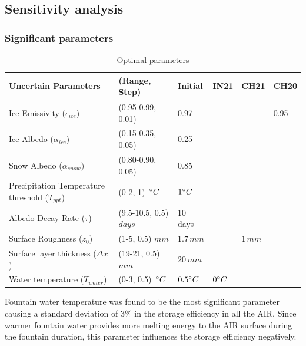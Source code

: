 \documentclass[utf8]{frontiersSCNS} %
\begin{document}
\subsection{Sensitivity analysis}
\subsubsection{Significant parameters}

\begin{table}
	\centering
	\caption{Optimal parameters}
	\label{tab:parameters}
	\begin{tabular}{@{}llllll@{}}
		\toprule
		\textbf{Uncertain Parameters}                             & \textbf{(Range, Step)}   & \textbf{Initial} & \textbf{IN21} & \textbf{CH21} & \textbf{CH20} \\\midrule
		Ice Emissivity ($\epsilon_{ice}$)               & (0.95-0.99, 0.01)        & 0.97             &           & & 0.95               \\
		Ice Albedo ($\alpha_{ice}$)                     & (0.15-0.35, 0.05)        & 0.25             &           & &               \\
		Snow Albedo ($\alpha_{snow})$                   & (0.80-0.90, 0.05)        & 0.85             &           & &               \\
		Precipitation Temperature threshold ($T_{ppt}$) & (0-2, 1) $\,\degree C$   & $1\degree C$     &           & &               \\
		Albedo Decay Rate ($\tau$)                      & (9.5-10.5, 0.5) $days$   & 10 days          &           & &              \\
		Surface Roughness ($z_0$)                       & (1-5, 0.5) $mm$          & $1.7\,mm$        &           & $1\,mm$&                \\
		Surface layer thickness ($\Delta x$)            & (19-21, 0.5) $mm$        & $20\,mm$         &           & &               \\
		Water temperature ($T_{water}$)                 & (0-3, 0.5) $\,\degree C$ & $0.5\degree C$   & $0\degree C$  & &               \\\bottomrule
	\end{tabular}
\end{table}


Fountain water temperature was found to be the most significant parameter causing a standard deviation of $3\%$ in the
storage efficiency in all the AIR. Since warmer fountain water provides more melting energy to the AIR surface during the fountain
duration, this parameter influences the storage efficiency negatively.
\end{document}

